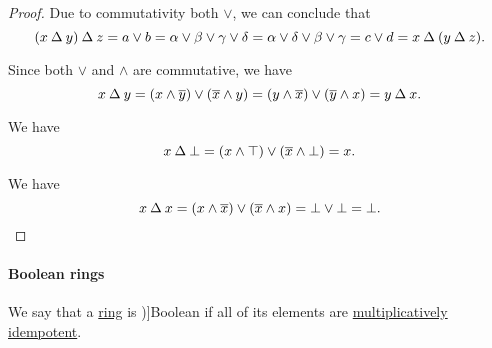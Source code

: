 \begin{proof}
  Due to commutativity both \( \vee \), we can conclude that
  \begin{equation*}
    (x \mathbin \Delta y) \mathbin \Delta z
    =
    a \vee b
    =
    \alpha \vee \beta \vee \gamma \vee \delta
    =
    \alpha \vee \delta \vee \beta \vee \gamma
    =
    c \vee d
    =
    x \mathbin \Delta (y \mathbin \Delta z).
  \end{equation*}

   Since both \( \vee \) and \( \wedge \) are commutative, we have
  \begin{equation*}
    x \symdiff y = (x \wedge \oline y) \vee (\oline x \wedge y) = (y \wedge \oline x) \vee (\oline y \wedge x) = y \symdiff x.
  \end{equation*}

   We have
  \begin{equation*}
    x \symdiff \bot = (x \wedge \top) \vee (\oline x \wedge \bot) = x.
  \end{equation*}

   We have
  \begin{equation*}
    x \symdiff x = (x \wedge \oline x) \vee (\oline x \wedge x) = \bot \vee \bot = \bot.
  \end{equation*}
\end{proof}

\paragraph{Boolean rings}

\begin{definition}\label{def:boolean_ring}
  We say that a \hyperref[def:ring]{ring} is \term[ru=Булево (кольцо) (\cite[75]{Владимиров1969БулевыАлгебры})]{Boolean} if all of its elements are \hyperref[def:semiring_idempotent]{multiplicatively idempotent}.
\end{definition}

